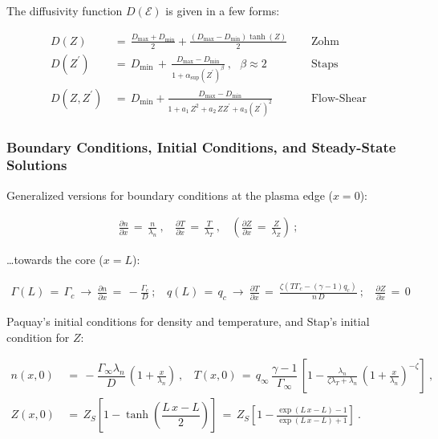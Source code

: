 \documentclass[a4paper,8pt]{article}
\begin{document}
\normalsize

The diffusivity function \(D(\mathcal{E})\) is given in a few forms:
\small

\begin{align}
    D(Z) \,&=\, \frac{D_\text{max} + D_\text{min}}{2} +
        \frac{(D_\text{max} - D_\text{min})\tanh(Z)}{2} ~~~~~~ &\text{Zohm} \\
    D(Z^\prime) \,&=\, D_\text{min} \,+\, \frac{D_\text{max} - D_\text{min}}
        {1 + \alpha_\text{sup}(Z^\prime)^\beta}~,~~~ \beta \approx 2 ~~~~~~
        &\text{Staps} \\
    D(Z, Z^\prime) \,&=\, D_\text{min} + \frac{D_\text{max} - D_\text{min}}
        {1 + a_1\,Z^2 + a_2\,Z Z^\prime + a_3\left(Z^\prime\right)^2} ~~~~~~
        &\text{Flow-Shear}
\end{align}

\normalsize

\subsubsection{Boundary Conditions, Initial Conditions, and Steady-State
Solutions}\label{boundary-conditions-initial-conditions-and-steady-state-solutions}

Generalized versions for boundary conditions at the plasma edge
(\(x=0\)): \small

\begin{align}
    \frac{\partial n}{\partial x} \,=\, \frac{n}{\lambda_n}~,
        ~~~~\frac{\partial T}{\partial x} \,=\, \frac{T}{\lambda_T}~,
        ~~~~\left(\frac{\partial Z}{\partial x} \,=\, \frac{Z}{\lambda_Z}\right)~;
\end{align}

\normalsize

\ldots{}towards the core (\(x=L\)): \small

\begin{align}
    \Gamma(L) \,=\, \Gamma_c ~\longrightarrow~ \frac{\partial n}{\partial x} \,=\, -\frac{\Gamma_c}{D}~;
        ~~~~ q(L) \,=\, q_c ~\longrightarrow~ \frac{\partial T}{\partial x} \,=\ \frac{\zeta\left(T \Gamma_c - (\gamma - 1) q_c\right)}{n\,D}~;
        ~~~~\frac{\partial Z}{\partial x} \,=\, 0
\end{align}

\normalsize

Paquay's initial conditions for density and temperature, and Stap's
initial condition for \(Z\): \small

\begin{align}
    n(x,0) \,&=\, -\dfrac{\Gamma_\infty \lambda_n}{D} \, \left(1 + \frac{x}{\lambda_n}\right)~,
        ~~~~ T(x,0) \,=\, q_\infty \, \dfrac{\gamma - 1}{\Gamma_\infty} \, \left[1 - \frac{\lambda_n}{\zeta \lambda_T + \lambda_n} \, \left(1 + \frac{x}{\lambda_n}\right)^{-\zeta}\right]~, \\
    Z(x,0) \,&=\, Z_S\left[1 - \tanh\left(\dfrac{L\,x - L}{2}\right)\right] \,=\, Z_S\left[1 - \frac{\exp(L\,x - L) - 1}{\exp(L\,x - L) + 1}\right]~.
\end{align}
\end{document}
